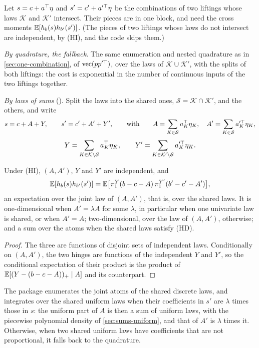 \documentclass[11pt,a4paper]{article}
\numberwithin{equation}{section}
\newcommand{\pos}[1]{(#1)_+}            %
\newcommand{\hinge}[1]{h_{#1}}          %
\newcommand{\slt}[2]{\pi^{#1}_{#2}}      %
\newcommand{\Hyp}[1]{\textup{(H#1)}}    %
\begin{document}
Let $s = c + a^\top\eta$ and $s' = c' + a'^\top\eta$ be the combinations of two liftings whose laws $\mathcal{K}$ and $\mathcal{K}'$ intersect.
Their pieces are in one block, and need the cross moments $\E[\hinge b(s)\hinge{b'}(s')]$.
(The pieces of two liftings whose laws do not intersect are independent, by \Hyp{I}, and the code skips them.)

\emph{By quadrature, the fallback.} The same enumeration and nested quadrature as in \cref{sec:one-combination}, of $\operatorname{vec}(pp'^\top)$, over the laws of $\mathcal{K} \cup \mathcal{K}'$,
with the splits of both liftings: the cost is exponential in the number of continuous inputs of the two liftings together.

\emph{By laws of sums} ().
Split the laws into the shared ones, $\mathcal{S} = \mathcal{K} \cap \mathcal{K}'$, and the others, and write
\[
s = c + A + Y, \qquad s' = c' + A' + Y',
\qquad\text{with}\qquad A = \sum_{K \in \mathcal{S}} a_K^\top\eta_K, \quad A' = \sum_{K \in \mathcal{S}} a_K'^\top\eta_K,
\]
\[
Y = \sum_{K \in \mathcal{K}\setminus\mathcal{S}} a_K^\top\eta_K, \qquad Y' = \sum_{K \in \mathcal{K}'\setminus\mathcal{S}} a_K'^\top\eta_K .
\]

\begin{proposition}
\label{prop:two-combinations}
Under \Hyp{I}, $(A, A')$, $Y$ and $Y'$ are independent, and
\[
\E[\hinge b(s)\hinge{b'}(s')] = \E\bigl[\slt Y1(b - c - A)\,\slt{Y'}1(b' - c' - A')\bigr],
\]
an expectation over the joint law of $(A, A')$, that is, over the shared laws.
It is one-dimensional when $A' = \lambda A$ for some $\lambda$, in particular when one univariate law is shared, or when $A' = A$;
two-dimensional, over the law of $(A, A')$, otherwise;
and a sum over the atoms when the shared laws satisfy \Hyp{D}.
\end{proposition}

\begin{proof}
The three are functions of disjoint sets of independent laws.
Conditionally on $(A, A')$, the two hinges are functions of the independent $Y$ and $Y'$, so the conditional expectation of their product is the product of $\E[\pos{Y - (b - c - A)} \mid A]$ and its counterpart.
\end{proof}

The package enumerates the joint atoms of the shared discrete laws,
and integrates over the shared uniform laws when their coefficients in $s'$ are $\lambda$ times those in $s$:
the uniform part of $A$ is then a sum of uniform laws, with the piecewise polynomial density of \cref{sec:sums-uniform}, and that of $A'$ is $\lambda$ times it.
Otherwise, when two shared uniform laws have coefficients that are not proportional, it falls back to the quadrature.
\end{document}
